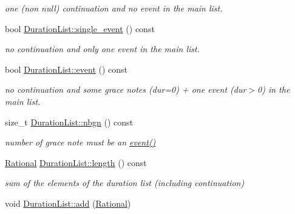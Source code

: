\begin{DoxyCompactItemize}
\begin{DoxyCompactList}\small\item\em one (non null) continuation and no event in the main list. \end{DoxyCompactList}\item 
\mbox{\label{group__output_gabdd5f118e0ea1566362a9eaed2ce0471}} 
bool \mbox{\hyperlink{group__output_gabdd5f118e0ea1566362a9eaed2ce0471}{Duration\+List\+::single\+\_\+event}} () const
\begin{DoxyCompactList}\small\item\em no continuation and only one event in the main list. \end{DoxyCompactList}\item 
\mbox{\label{group__output_gadd91aa5ec57a51c6253ea872eadb28dc}} 
bool \mbox{\hyperlink{group__output_gadd91aa5ec57a51c6253ea872eadb28dc}{Duration\+List\+::event}} () const
\begin{DoxyCompactList}\small\item\em no continuation and some grace notes (dur=0) + one event (dur$>$0) in the main list. \end{DoxyCompactList}\item 
\mbox{\label{group__output_ga72427605bbceabff329459a610db1201}} 
size\+\_\+t \mbox{\hyperlink{group__output_ga72427605bbceabff329459a610db1201}{Duration\+List\+::nbgn}} () const
\begin{DoxyCompactList}\small\item\em number of grace note must be an \mbox{\hyperlink{group__output_gadd91aa5ec57a51c6253ea872eadb28dc}{event()}} \end{DoxyCompactList}\item 
\mbox{\label{group__output_ga540cf8decb4f62a80e871ab1e6dd31de}} 
\mbox{\hyperlink{classRational}{Rational}} \mbox{\hyperlink{group__output_ga540cf8decb4f62a80e871ab1e6dd31de}{Duration\+List\+::length}} () const
\begin{DoxyCompactList}\small\item\em sum of the elements of the duration list (including continuation) \end{DoxyCompactList}\item 
void \mbox{\hyperlink{group__output_gaddb48455388f36f48ace0f0c0b250105}{Duration\+List\+::add}} (\mbox{\hyperlink{classRational}{Rational}})

\end{DoxyCompactItemize}
